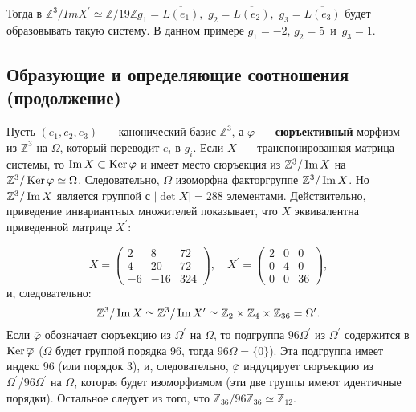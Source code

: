     \newpage
    \noindent Тогда в $\mathbb{Z}^3/ImX^\prime \simeq \mathbb{Z}/19\mathbb{Z}$\quad\quad$g_1 = \overline{L(e_1)},\,\,g_2 = \overline{L(e_2)},\,\,g_3 = \overline{L(e_3)}$ будет образовывать такую систему. В данном примере $g_1 = -2,\,g_2 = 5\,$ и $\,g_3 = 1$.
    \subsection{\normalsize{Образующие и определяющие соотношения (продолжение)}}

    Пусть $(e_1, e_2, e_3)$~— канонический базис $\mathbb{Z}^3$, а $\varphi$~— {\bf{сюръективный}} морфизм из $\mathbb{Z}^3$ на $\Omega$, который переводит $e_i$ в $g_i$. Если $X$~— транспонированная матрица системы, то $\operatorname{Im} X \subset \operatorname{Ker}
    \varphi$ и имеет место сюръекция из $\mathbb{Z}^3/\operatorname{Im} X$ на $\mathbb{Z}^3/\operatorname{Ker} \varphi \simeq \Omega$. Следовательно, $\Omega$ изоморфна факторгруппе $\mathbb{Z}^3/\operatorname{Im} X$. Но $\mathbb{Z}^3/\operatorname{Im} X$ является группой с $|\det X| = 288$ элементами. Действительно, приведение инвариантных множителей показывает, что $X$ эквивалентна приведенной матрице $X^\prime$:

    $$ X = \begin{pmatrix}
    2 & 8 & 72\\
    4 & 20 & 72\\
    -6 & -16 & 324
    \end{pmatrix},\quad X^\prime = \begin{pmatrix}
    2 & 0 & 0\\
    0 & 4 & 0\\
    0 & 0 & 36
    \end{pmatrix},$$
    и, следовательно:
    $$\mathbb{Z}^3/\operatorname{Im} X \simeq \mathbb{Z}^3/\operatorname{Im} X^\prime \simeq \mathbb{Z}_2 \times \mathbb{Z}_4 \times \mathbb{Z}_{36} = \Omega^\prime.$$
    Если $\overline\varphi$ обозначает сюръекцию из $\Omega^\prime$ на $\Omega$, то подгруппа $96\Omega^\prime$ из $\Omega^\prime$ содержится в $\operatorname{Ker}\overline\varphi$ ($\Omega$ будет группой порядка 96, тогда $96\Omega = \{0\}$). Эта подгруппа имеет индекс 96 (или порядок 3), и, следовательно, $\overline\varphi$ индуцирует сюръекцию из $\Omega^\prime/96\Omega^\prime$ на $\Omega$, которая будет изоморфизмом (эти две группы имеют идентичные порядки). Остальное следует из того, что $\mathbb{Z}_{36}/96\mathbb{Z}_{36}\simeq \mathbb{Z}_{12}$.
